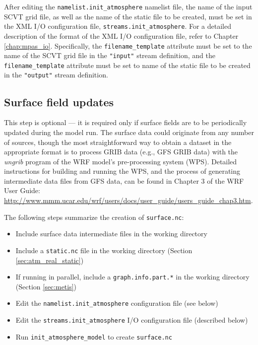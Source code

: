 After editing the {\tt namelist.init\_atmosphere} namelist file, the name of the input SCVT grid file, as well as the name of the static file to be created, must be set in the XML I/O configuration file, {\tt streams.init\_atmosphere}. For a detailed description of the format of the XML I/O configuration file, refer to Chapter \ref{chap:mpas_io}. Specifically, the {\tt filename\_template} attribute must be set to the name of the SCVT grid file in the {\tt "input"} stream definition, and the {\tt filename\_template} attribute must be set to name of the static file to be created in the {\tt "output"} stream definition.


\subsection{Surface field updates}
\label{sec:atm_real_surface}

This step is optional --- it is required only if surface fields are to be periodically updated during the model run.  The surface data could originate from any number of sources, though the most straightforward way to obtain a dataset in the appropriate format is to process GRIB data (e.g., GFS GRIB data) with the {\em ungrib} program of the WRF model's pre-processing system (WPS).  Detailed instructions for building and running the WPS, and the process of generating intermediate data files from GFS data, can be found in Chapter 3 of the WRF User Guide: \url{http://www.mmm.ucar.edu/wrf/users/docs/user\_guide/users\_guide\_chap3.htm}.

The following steps summarize the creation of {\tt surface.nc}:

\begin{itemize}
\item Include surface data intermediate files in the working directory
\item Include a {\tt static.nc} file in the working directory (Section \ref{sec:atm_real_static})
\item If running in parallel, include a {\tt graph.info.part.*} in the working directory (Section \ref{sec:metis})
\item Edit the {\tt namelist.init\_atmosphere} configuration file (see below)
\item Edit the {\tt streams.init\_atmosphere} I/O configuration file (described below)
\item Run {\tt init\_atmosphere\_model} to create {\tt surface.nc}
\end{itemize}


